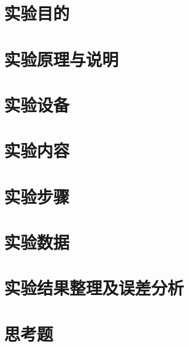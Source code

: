 \documentclass{../ElectromagneticFieldTemplate}
\begin{document}
\maketitle


\section{实验目的}


\section{实验原理与说明}


\section{实验设备}


\section{实验内容}


\section{实验步骤}


\section{实验数据}


\section{实验结果整理及误差分析}


\section{思考题}
\end{document}
